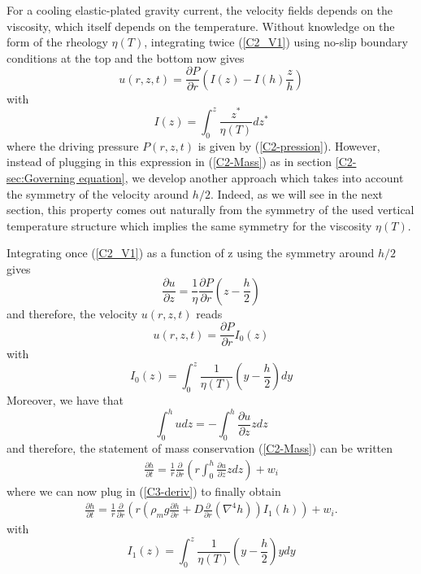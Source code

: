 For  a cooling  elastic-plated  gravity current,  the velocity  fields
depends   on   the   viscosity,    which   itself   depends   on   the
temperature. Without knowledge on the  form of the rheology $\eta(T)$,
integrating twice  (\ref{C2_V1}) using no-slip boundary  conditions at
the top and the bottom now gives
\begin{equation}
  u(r,z,t) = \frac{\partial P}{\partial r}\left(I(z)-I(h)\frac{z}{h}\right)
\end{equation}
with
\begin{equation}
  I(z) = \int_0^z\frac{z^*}{\eta(T)}dz^*
\end{equation}
where the driving pressure $P(r,z,t)$ is given by (\ref{C2-pression}).
However, instead of plugging in  this expression in (\ref{C2-Mass}) as
in  section   \ref{C2-sec:Governing  equation},  we   develop  another
approach which takes into account  the symmetry of the velocity around
$h/2$.  Indeed,  as we  will see  in the  next section,  this property
comes out naturally from the symmetry of the used vertical temperature
structure  which implies the same  symmetry for
the viscosity $\eta(T)$.

Integrating once (\ref{C2_V1})  as a function of z  using the symmetry
around $h/2$ gives
\begin{equation}
  \frac{\partial   u}{\partial   z}   =   \frac{1}{\eta}\frac{\partial
    P}{\partial r}\left(z-\frac{h}{2}\right)
\label{C3-deriv}
\end{equation}
and therefore, the velocity $u(r,z,t)$ reads
\begin{equation}
  u(r,z,t) = \frac{\partial P}{\partial r} I_0(z)
\end{equation}
with
\begin{equation}
  I_0(z) = \int_0^z\frac{1}{\eta(T)}\left(y-\frac{h}{2}\right)dy
\label{C3-I_0}
\end{equation}
Moreover, we have that
\begin{equation}
  \int_0^h u dz = -\int_0^h\frac{\partial u}{\partial z}zdz
\end{equation}
and therefore, the statement  of mass conservation (\ref{C2-Mass}) can
be written
\begin{eqnarray}
  \frac{\partial h}{\partial t} = \frac{1}{r}
  \frac{\partial}{\partial
  r} \left( r\int_0^h\frac{\partial u}{\partial z}zdz\right) + w_i
  \label{C3-Mass}
\end{eqnarray}
where we can now plug in (\ref{C3-deriv}) to finally obtain
\begin{eqnarray}
  \frac{\partial h}{\partial t} = \frac{1}{r}
  \frac{\partial}{\partial r} \left( r\left(\rho_m g \frac{\partial h}{\partial      r}+D\frac{\partial}{\partial      r}\left(\nabla^4h\right)\right)I_1(h)\right)
  + w_i.
  \label{C3-Mass-2}
\end{eqnarray}
with 
\begin{equation}
  I_1(z) = \int_0^z\frac{1}{\eta(T)}\left(y-\frac{h}{2}\right)ydy
\label{C3-I_1}
\end{equation}

